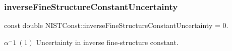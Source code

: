 \subsubsection{\texorpdfstring{inverse\+Fine\+Structure\+Constant\+Uncertainty}{inverseFineStructureConstantUncertainty}}
{\footnotesize\ttfamily const double N\+I\+S\+T\+Const\+::inverse\+Fine\+Structure\+Constant\+Uncertainty = 0.}

$\alpha^-1 \ (1)$ Uncertainty in inverse fine-\/structure constant. 